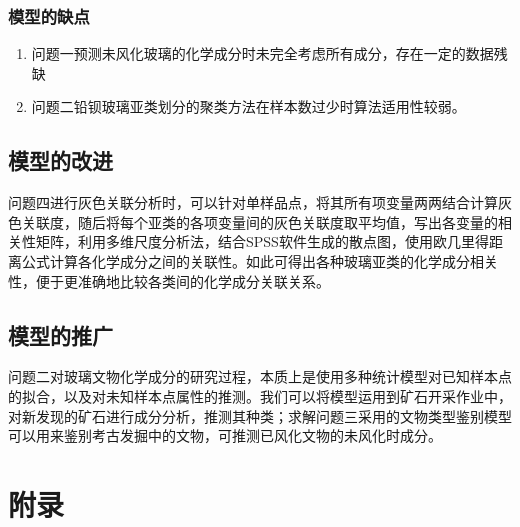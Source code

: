 \documentclass{my_paper}
\begin{document}
\subsubsection{模型的缺点}
\begin{enumerate}
    \item 问题一预测未风化玻璃的化学成分时未完全考虑所有成分，存在一定的数据残缺
    \item 问题二铅钡玻璃亚类划分的聚类方法在样本数过少时算法适用性较弱。
\end{enumerate}

\subsection{模型的改进}
问题四进行灰色关联分析时，可以针对单样品点，将其所有项变量两两结合计算灰色关联度，随后将每个亚类的各项变量间的灰色关联度取平均值，写出各变量的相关性矩阵，利用多维尺度分析法，结合SPSS软件生成的散点图，使用欧几里得距离公式计算各化学成分之间的关联性。如此可得出各种玻璃亚类的化学成分相关性，便于更准确地比较各类间的化学成分关联关系。

\subsection{模型的推广}
问题二对玻璃文物化学成分的研究过程，本质上是使用多种统计模型对已知样本点的拟合，以及对未知样本点属性的推测。我们可以将模型运用到矿石开采作业中，对新发现的矿石进行成分分析，推测其种类；求解问题三采用的文物类型鉴别模型可以用来鉴别考古发掘中的文物，可推测已风化文物的未风化时成分。
 
\begin{center}
 
\end{center}

\newpage
\section{附录}
\end{document}
